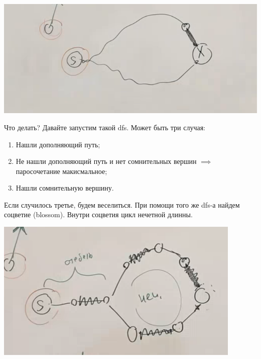 \begin{center}
    \includegraphics[scale=0.6]{img/parsoch_dfs_even_and_odd_paths}
\end{center}

Что делать?
Давайте запустим такой dfs.
Может быть три случая:
\begin{enumerate}
    \item Нашли дополняющий путь;
    \item Не нашли дополняющий путь и нет сомнительных вершин $\implies$ паросочетание макисмальное;
    \item Нашли сомнительную вершину.
\end{enumerate}

Если случилось третье, будем веселиться.
При помощи того же dfs-а найдем соцветие (blossom).
Внутри соцветия цикл нечетной длинны.

\begin{center}
    \includegraphics[scale=0.7]{img/parsoch_blossom}
\end{center}

